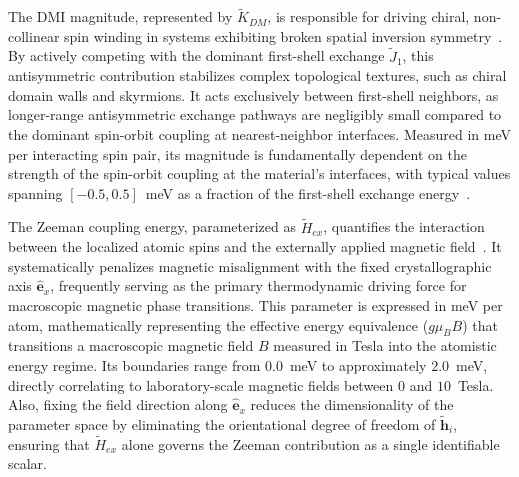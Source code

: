 \documentclass[letterpaper, 12, one column]{article}
\begin{document}
The DMI magnitude, represented by $\tilde{K}_{DM}$, is responsible for driving chiral, non-collinear spin winding in systems exhibiting broken spatial inversion symmetry~\cite{fert2017magnetic}. By actively competing with the dominant first-shell exchange $\tilde{J}_1$, 
this antisymmetric contribution stabilizes complex topological textures, such as chiral domain walls and skyrmions. It acts exclusively between first-shell neighbors, as longer-range antisymmetric exchange pathways are negligibly small compared to the dominant spin-orbit coupling at nearest-neighbor interfaces. Measured in meV per interacting spin pair, its magnitude is fundamentally dependent on the strength of the spin-orbit coupling 
at the material's interfaces, with typical values spanning 
$[-0.5, 0.5]$~meV as a fraction of the first-shell exchange 
energy~\cite{fert2017magnetic}.

The Zeeman coupling energy, parameterized as $\tilde{H}_{ex}$, quantifies the interaction between the localized atomic spins and the externally applied magnetic field~\cite{evans2014atomistic}. It systematically 
penalizes magnetic misalignment with the fixed crystallographic axis $\hat{\mathbf{e}}_x$, frequently serving as the primary thermodynamic driving force for macroscopic magnetic phase transitions. This 
parameter is expressed in meV per atom, mathematically representing the effective energy equivalence ($g\mu_B B$) that transitions a macroscopic magnetic field $B$ measured in Tesla into the atomistic energy regime. Its boundaries range from $0.0$~meV to approximately $2.0$~meV, directly correlating to laboratory-scale magnetic fields 
between $0$ and $10$~Tesla. Also, fixing the field direction along $\hat{\mathbf{e}}_x$ reduces the dimensionality of the parameter space by eliminating the orientational degree of freedom of $\tilde{\mathbf{h}}_i$, ensuring that $\tilde{H}_{ex}$ alone governs the Zeeman contribution as a single identifiable scalar.
\end{document}
